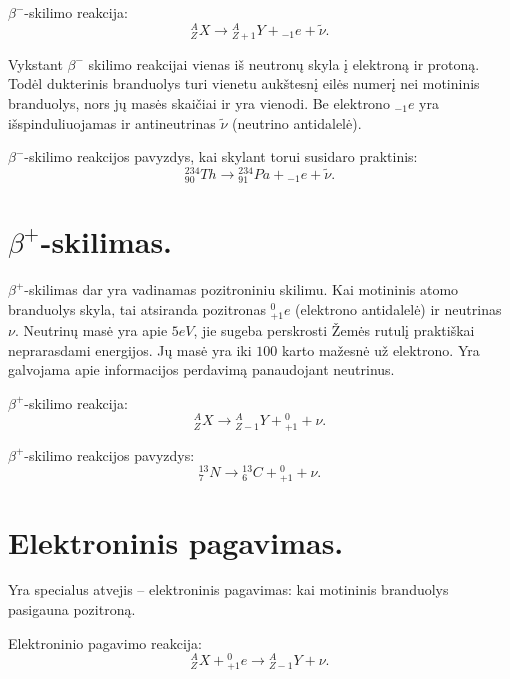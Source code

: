 $\beta^{-}$-skilimo reakcija:
\begin{equation*}
  {}_{Z}^{A}X \to {}_{Z+1}^{A}Y + {}_{-1}e + \tilde{\nu}.
\end{equation*}

Vykstant $\beta^{-}$ skilimo reakcijai vienas iš neutronų skyla
į elektroną ir protoną. Todėl dukterinis branduolys turi vienetu
aukštesnį eilės numerį nei motininis branduolys, nors jų masės
skaičiai ir yra vienodi. Be elektrono ${}_{-1}e$ yra išspinduliuojamas
ir antineutrinas $\tilde{\nu}$ (neutrino antidalelė).

$\beta^{-}$-skilimo reakcijos pavyzdys, kai skylant torui susidaro
praktinis:
\begin{equation*}
  {}_{90}^{234}Th \to {}_{91}^{234}Pa + {}_{-1}e + \tilde{\nu}.
\end{equation*}

\section{$\beta^{+}$-skilimas.}

$\beta^{+}$-skilimas dar yra vadinamas pozitroniniu skilimu. Kai
motininis atomo branduolys skyla, tai atsiranda pozitronas
${}_{+1}^{0}e$ (elektrono antidalelė) ir neutrinas $\nu$. Neutrinų masė
yra apie $5 eV$, jie sugeba perskrosti Žemės rutulį praktiškai
neprarasdami energijos. Jų masė yra iki $100$ karto mažesnė už
elektrono. Yra galvojama apie informacijos perdavimą panaudojant
neutrinus.

$\beta^{+}$-skilimo reakcija:
\begin{equation*}
  {}_{Z}^{A}X \to {}_{Z-1}^{A}Y + {}_{+1}^{0} + \nu.
\end{equation*}

$\beta^{+}$-skilimo reakcijos pavyzdys:
\begin{equation*}
  {}_{7}^{13}N \to {}_{6}^{13}C + {}_{+1}^{0} + \nu.
\end{equation*}

\section{Elektroninis pagavimas.}

Yra specialus atvejis – elektroninis pagavimas: kai motininis
branduolys pasigauna pozitroną.

Elektroninio pagavimo reakcija:
\begin{equation*}
  {}_{Z}^{A}X + {}_{+1}^{0}e \to {}_{Z-1}^{A}Y + \nu.
\end{equation*}

